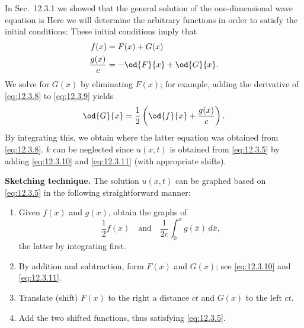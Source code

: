 In Sec.~12.3.1 we showed that the general solution of the one-dimensional wave equation is
Here we will determine the arbitrary functions in order to satisfy the initial conditions:
These initial conditions imply that
\begin{align}
\label{eq:12.3.8}
f(x) &= F(x) + G(x) \\
\label{eq:12.3.9}
\frac{g(x)}{c} &= -\od{F}{x} + \od{G}{x}.
\end{align}
We solve for $G(x)$ by eliminating $F(x)$; for example, adding the derivative of \eqref{eq:12.3.8} to \eqref{eq:12.3.9} yields
\[
\od{G}{x} = \frac{1}{2}\left(\od{f}{x} + \frac{g(x)}{c}\right).
\]
By integrating this, we obtain
where the latter equation was obtained from \eqref{eq:12.3.8}.  $k$ can be neglected since $u(x,t)$ is obtained from \eqref{eq:12.3.5} by adding \eqref{eq:12.3.10} and \eqref{eq:12.3.11} (with appropriate shifts).

\textbf{Sketching technique.}  The solution $u(x,t)$ can be graphed based on \eqref{eq:12.3.5} in the following straightforward manner:
\begin{enumerate}
\item Given $f(x)$ and $g(x)$, obtain the graphs of
\[
\frac{1}{2}f(x) \quad \text{and} \quad \frac{1}{2c}\int_0^x g(\bar{x})\,d\bar{x},
\]
the latter by integrating first.
\item By addition and subtraction, form $F(x)$ and $G(x)$; see \eqref{eq:12.3.10} and \eqref{eq:12.3.11}.
\item Translate (shift) $F(x)$ to the right a distance $ct$ and $G(x)$ to the left $ct$.
\item Add the two shifted functions, thus satisfying \eqref{eq:12.3.5}.
\end{enumerate}

